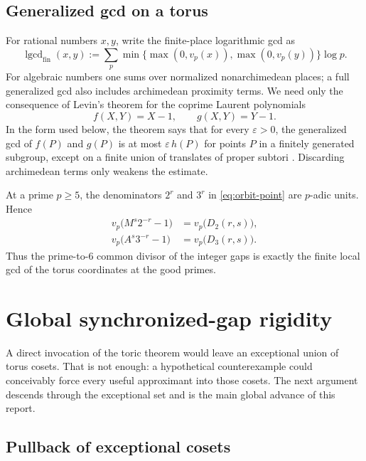 \documentclass[11pt,oneside]{article}
\theoremstyle{definition}
\newcommand{\vp}{v_p}
\newcommand{\lgcd}{\operatorname{lgcd}}
\newcommand{\eps}{\varepsilon}
\begin{document}
\subsection{Generalized gcd on a torus}

For rational numbers $x,y$, write the finite-place logarithmic gcd as
\begin{equation}\label{eq:finite-lgcd}
  \lgcd_{\mathrm{fin}}(x,y)
  :=\sum_{p}\min\bigl\{\max(0,\vp(x)),\max(0,\vp(y))\bigr\}\log p.
\end{equation}
For algebraic numbers one sums over normalized nonarchimedean places; a
full generalized gcd also includes archimedean proximity terms.  We need
only the consequence of Levin's theorem for the coprime Laurent
polynomials
\[
  f(X,Y)=X-1,
  \qquad g(X,Y)=Y-1.
\]
In the form used below, the theorem says that for every $\eps>0$, the
generalized gcd of $f(P)$ and $g(P)$ is at most $\eps\,h(P)$ for points
$P$ in a finitely generated subgroup, except on a finite union of
translates of proper subtori \cite{Levin2019,Xiao2022}.  Discarding
archimedean terms only weakens the estimate.

At a prime $p\ge5$, the denominators $2^r$ and $3^r$ in
\eqref{eq:orbit-point} are $p$-adic units.  Hence
\begin{align}
  \vp\bigl(M^s2^{-r}-1\bigr)&=\vp\bigl(D_2(r,s)\bigr),\label{eq:local-gap1}\\
  \vp\bigl(A^s3^{-r}-1\bigr)&=\vp\bigl(D_3(r,s)\bigr).
  \label{eq:local-gap2}
\end{align}
Thus the prime-to-$6$ common divisor of the integer gaps is exactly the
finite local gcd of the torus coordinates at the good primes.

\section{Global synchronized-gap rigidity}\label{sec:global-gcd}

A direct invocation of the toric theorem would leave an exceptional union
of torus cosets.  That is not enough: a hypothetical counterexample could
conceivably force every useful approximant into those cosets.  The next
argument descends through the exceptional set and is the main global
advance of this report.

\subsection{Pullback of exceptional cosets}
\end{document}

